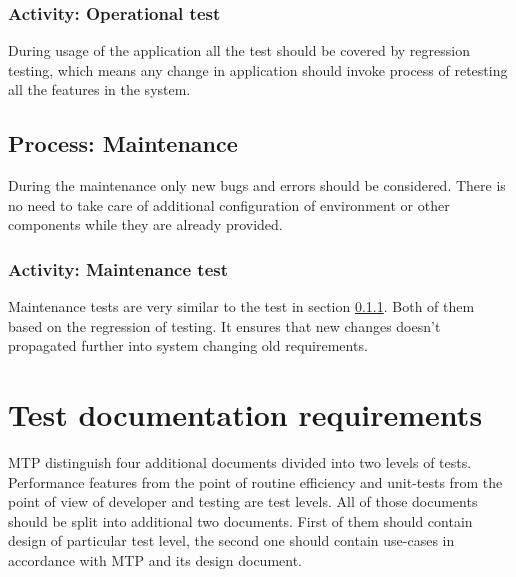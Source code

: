 		\subsubsection{Activity: Operational test} \label{s:details-of-the-master-test-plan:activity-operational-test}
		During usage of the application all the test should be covered by regression testing, which means any change in application should invoke process of retesting all the features in the system.
	\subsection{Process: Maintenance} \label{s:details-of-the-master-test-plan:process-maintenance}
		During the maintenance only new bugs and errors should be considered. There is no need to take care of additional configuration of environment or other components while they are already provided.
		\subsubsection{Activity: Maintenance test} \label{s:details-of-the-master-test-plan:activity-maintenance-test}
		Maintenance tests are very similar to the test in section \ref{s:details-of-the-master-test-plan:activity-maintenance-test}. Both of them based on the regression of testing. It ensures that new changes doesn't propagated further into system changing old requirements. 
\section{Test documentation requirements} \label{s:details-of-the-master-test-plan:test-documentation-requirements}
	\begin{comment}
		$<$Define the purpose, format, and content of all other testing documents that are to be used (in addition to those that are defined in MTP Section 2.4). A description of these documents may be found in Clause 9 through Clause 16. If the test effort uses test documentation or test levels different from those in this standard (i.e., component, component integration, system, and acceptance), this section needs to map the documentation and process requirements to the test documentation contents defined in this standard. $>$
	\end{comment}
	\gls{MTP} distinguish four additional documents divided into two levels of tests. Performance features from the point of routine efficiency and unit-tests from the point of view of developer and testing are test levels. All of those documents should be split into additional two documents. First of them should contain design of particular test level, the second one should contain use-cases in accordance with \gls{MTP} and its design document.
